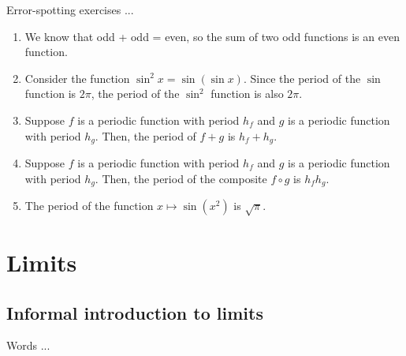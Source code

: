 \documentclass[10pt]{amsart}
\begin{document}
Error-spotting exercises ...

\begin{enumerate}
\item We know that odd + odd = even, so the sum of two odd functions
  is an even function.
\item Consider the function $\sin^2 x = \sin (\sin x)$. Since the
  period of the $\sin$ function is $2\pi$, the period of the $\sin^2$
  function is also $2\pi$.
\item Suppose $f$ is a periodic function with period $h_f$ and $g$ is
  a periodic function with period $h_g$. Then, the period of $f + g$
  is $h_f + h_g$.
\item Suppose $f$ is a periodic function with period $h_f$ and $g$ is
  a periodic function with period $h_g$. Then, the period of the
  composite $f \circ g$ is $h_fh_g$.
\item The period of the function $x \mapsto \sin(x^2)$ is $\sqrt{\pi}$.
\end{enumerate}

\section{Limits}

\subsection{Informal introduction to limits}

Words ...
\end{document}
